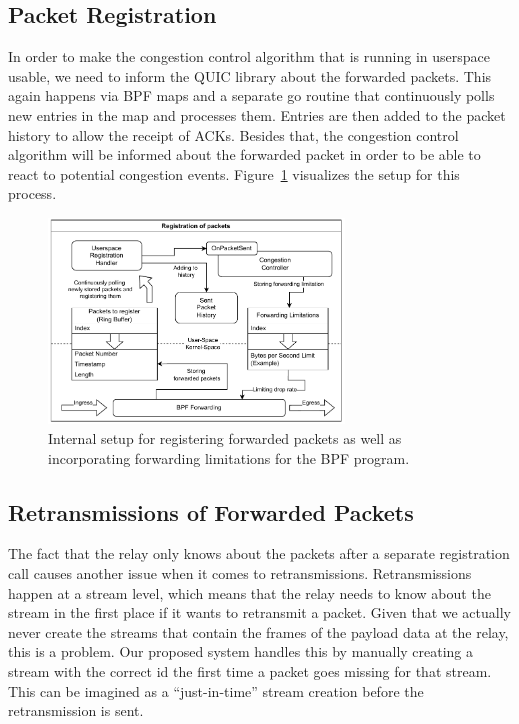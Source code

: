 \subsection{Packet Registration}
In order to make the congestion control algorithm that is running in userspace
usable, we need to inform the QUIC library about the forwarded packets.
This again happens via BPF maps and a separate go routine that continuously
polls new entries in the map and processes them.
Entries are then added to the packet history to allow the receipt of ACKs.
Besides that, the congestion control algorithm will be informed about the
forwarded packet in order to be able to react to potential congestion events.
Figure~\ref{fig:forward-registration} visualizes the setup for this process.
\vspace{0.5cm}
\begin{figure}[H]
    \centering
    \includegraphics[width=0.7\textwidth]{figures/03_fast_relays/forward-registration.drawio.pdf}
    \caption[Packet registration schematic]{Internal setup for registering forwarded packets as well as incorporating forwarding
    limitations for the BPF program.}\label{fig:forward-registration}
\end{figure}

\subsection{Retransmissions of Forwarded Packets}
The fact that the relay only knows about the packets after a separate registration call causes 
another issue when it comes to retransmissions.
Retransmissions happen at a stream level, which means that the relay needs to know about the 
stream in the first place if it wants to retransmit a packet.
Given that we actually never create the streams that contain the frames of the payload data 
at the relay, this is a problem.
Our proposed system handles this by manually creating a stream with the correct id the first
time a packet goes missing for that stream.
This can be imagined as a ``just-in-time'' stream creation before the retransmission is sent.

